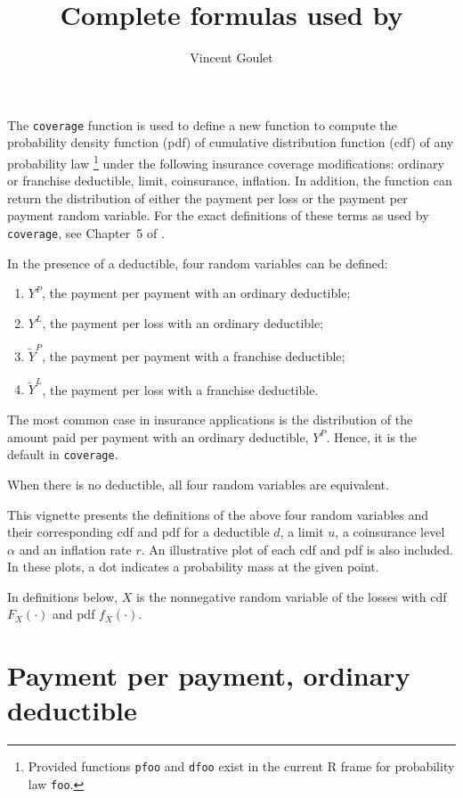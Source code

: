 \documentclass{article}
\title{Complete formulas used by \coverage}
\author{Vincent Goulet}
\newcommand{\coverage}{\texttt{coverage}}
\begin{document}
\maketitle

The {\coverage} function is used to define a new function to compute
the probability density function (pdf) of cumulative distribution
function (cdf) of any probability law%
\footnote{Provided functions \texttt{pfoo} and \texttt{dfoo} exist in
  the current \textsf{R} frame for probability law \texttt{foo}.} %
under the following insurance coverage modifications: ordinary or
franchise deductible, limit, coinsurance, inflation. In addition, the
function can return the distribution of either the payment per loss or
the payment per payment random variable. For the exact definitions of
these terms as used by {\coverage}, see Chapter~5 of
\cite{LossModels2e}.

In the presence of a deductible, four random variables can be defined:
\begin{enumerate}
\item $Y^P$, the payment per payment with an ordinary deductible;
\item $Y^L$, the payment per loss with an ordinary deductible;
\item $\tilde{Y}^P$, the payment per payment with a franchise
  deductible;
\item $\tilde{Y}^L$, the payment per loss with a franchise deductible.
\end{enumerate}
The most common case in insurance applications is the distribution of
the amount paid per payment with an ordinary deductible, $Y^P$.
Hence, it is the default in {\coverage}.

When there is no deductible, all four random variables are equivalent.

This vignette presents the definitions of the above four random
variables and their corresponding cdf and pdf for a deductible $d$, a
limit $u$, a coinsurance level $\alpha$ and an inflation rate $r$. An
illustrative plot of each cdf and pdf is also included. In these
plots, a dot indicates a probability mass at the given point.

In definitions below, $X$ is the nonnegative random variable of the
losses with cdf $F_X(\cdot)$ and pdf $f_X(\cdot)$.


\section{Payment per payment, ordinary deductible}
\end{document}
